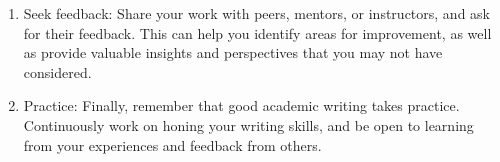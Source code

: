 \begin{enumerate}
    \item Seek feedback: Share your work with peers, mentors, or instructors, and ask for their feedback. This can help you identify areas for improvement, as well as provide valuable insights and perspectives that you may not have considered.

    \item Practice: Finally, remember that good academic writing takes practice. Continuously work on honing your writing skills, and be open to learning from your experiences and feedback from others.
    
\end{enumerate}